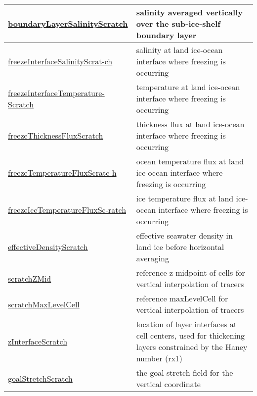 {\begin{center}
\begin{longtable}{| p{2.0in} | p{4.0in} |}
    \hline
    \hyperref[subsec:var_sec_scratch_boundaryLayerSalinityScratch]{boundaryLayerSalinityScratch} & salinity averaged vertically over the sub-ice-shelf boundary layer \\
    \hline
    \hyperref[subsec:var_sec_scratch_freezeInterfaceSalinityScratch]{freezeInterfaceSalinityScrat-}\hyperref[subsec:var_sec_scratch_freezeInterfaceSalinityScratch]{ch  }& salinity at land ice-ocean interface where freezing is occurring \\
    \hline
    \hyperref[subsec:var_sec_scratch_freezeInterfaceTemperatureScratch]{freezeInterfaceTemperature-}\hyperref[subsec:var_sec_scratch_freezeInterfaceTemperatureScratch]{Scratch  }& temperature at land ice-ocean interface where freezing is occurring \\
    \hline
    \hyperref[subsec:var_sec_scratch_freezeThicknessFluxScratch]{freezeThicknessFluxScratch} & thickness flux at land ice-ocean interface where freezing is occurring \\
    \hline
    \hyperref[subsec:var_sec_scratch_freezeTemperatureFluxScratch]{freezeTemperatureFluxScratc-}\hyperref[subsec:var_sec_scratch_freezeTemperatureFluxScratch]{h  }& ocean temperature flux at land ice-ocean interface where freezing is occurring \\
    \hline
    \hyperref[subsec:var_sec_scratch_freezeIceTemperatureFluxScratch]{freezeIceTemperatureFluxSc-}\hyperref[subsec:var_sec_scratch_freezeIceTemperatureFluxScratch]{ratch  }& ice temperature flux at land ice-ocean interface where freezing is occurring \\
    \hline
    \hyperref[subsec:var_sec_scratch_effectiveDensityScratch]{effectiveDensityScratch} & effective seawater density in land ice before horizontal averaging \\
    \hline
    \hyperref[subsec:var_sec_scratch_scratchZMid]{scratchZMid} & reference z-midpoint of cells for vertical interpolation of tracers \\
    \hline
    \hyperref[subsec:var_sec_scratch_scratchMaxLevelCell]{scratchMaxLevelCell} & reference maxLevelCell for vertical interpolation of tracers \\
    \hline
    \hyperref[subsec:var_sec_scratch_zInterfaceScratch]{zInterfaceScratch} & location of layer interfaces at cell centers, used for thickening layers constrained by the Haney number (rx1) \\
    \hline
    \hyperref[subsec:var_sec_scratch_goalStretchScratch]{goalStretchScratch} & the goal stretch field for the vertical coordinate \\

\end{longtable}
\end{center}}
